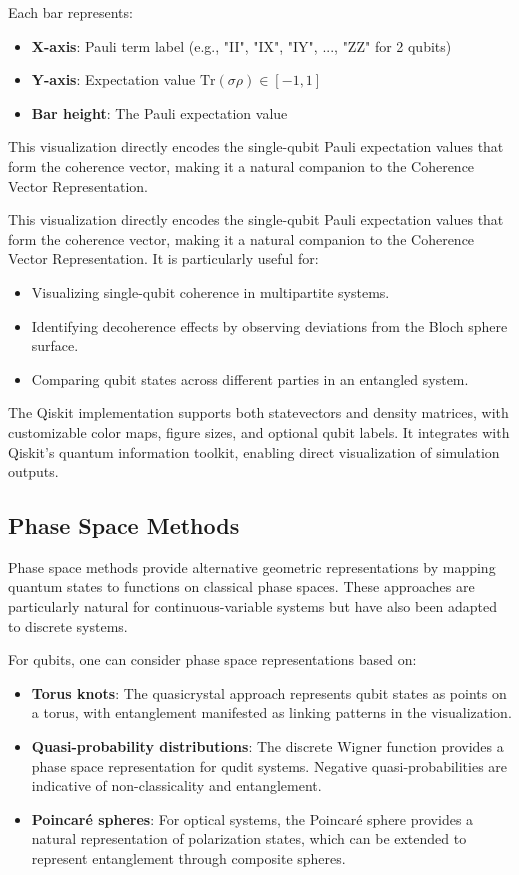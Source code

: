\documentclass[%
 amsmath,amssymb,
 aps,
rmp,
]{revtex4-2}
\begin{document}
Each bar represents:
\begin{itemize}
	\item \textbf{X-axis}: Pauli term label (e.g., "II", "IX", "IY", ..., "ZZ" for 2 qubits)
	\item \textbf{Y-axis}: Expectation value $\text{Tr}(\sigma\rho) \in [-1,1]$
	\item \textbf{Bar height}: The Pauli expectation value
\end{itemize}

This visualization directly encodes the single-qubit Pauli expectation values that form the coherence vector, making it a natural companion to the Coherence Vector Representation.

This visualization directly encodes the single-qubit Pauli expectation values that form the coherence vector, making it a natural companion to the Coherence Vector Representation. It is particularly useful for:


\begin{itemize}
	\item Visualizing single-qubit coherence in multipartite systems.
	\item Identifying decoherence effects by observing deviations from the Bloch sphere surface.
	\item Comparing qubit states across different parties in an entangled system.
\end{itemize}

The Qiskit implementation supports both statevectors and density matrices, with customizable color maps, figure sizes, and optional qubit labels. It integrates with Qiskit's quantum information toolkit, enabling direct visualization of simulation outputs.

\subsection{Phase Space Methods}
\label{sec:phase-space}

Phase space methods provide alternative geometric representations by mapping quantum states to functions on classical phase spaces. These approaches are particularly natural for continuous-variable systems but have also been adapted to discrete systems.

For qubits, one can consider phase space representations based on:
\begin{itemize}
	\item \textbf{Torus knots}: The quasicrystal approach represents qubit states as points on a torus, with entanglement manifested as linking patterns in the visualization.
	\item \textbf{Quasi-probability distributions}: The discrete Wigner function provides a phase space representation for qudit systems. Negative quasi-probabilities are indicative of non-classicality and entanglement.
	\item \textbf{Poincaré spheres}: For optical systems, the Poincaré sphere provides a natural representation of polarization states, which can be extended to represent entanglement through composite spheres.
\end{itemize}
\end{document}
